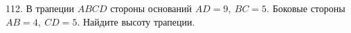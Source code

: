 112. В трапеции $ABCD$ стороны оснований $AD=9,\ BC=5.$ Боковые стороны $AB=4,\ CD=5.$ Найдите высоту трапеции.\\
